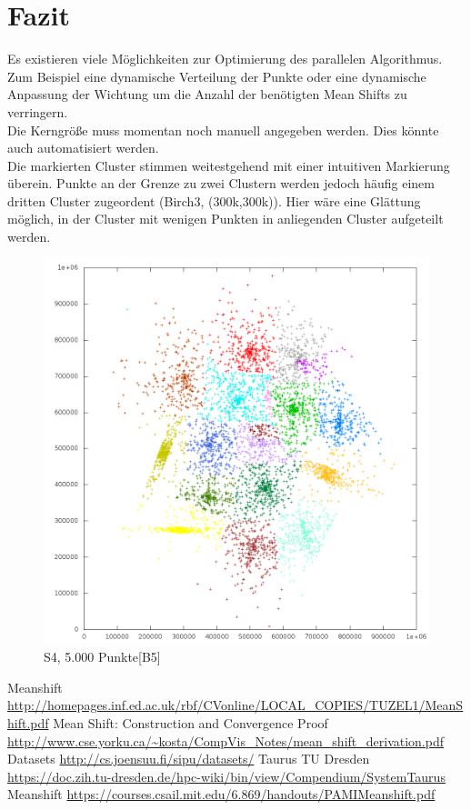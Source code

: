 \section{Fazit}
	Es existieren viele Möglichkeiten zur Optimierung des parallelen Algorithmus. Zum Beispiel eine dynamische Verteilung der Punkte oder eine dynamische Anpassung
	der Wichtung um die Anzahl der benötigten Mean Shifts zu verringern.\\
	Die Kerngröße muss momentan noch manuell angegeben werden. Dies könnte auch automatisiert werden.\\
	Die markierten Cluster stimmen weitestgehend mit einer intuitiven Markierung überein. Punkte an der Grenze zu zwei Clustern werden jedoch häufig einem 
	dritten Cluster zugeordent (Birch3, (300k,300k)). Hier wäre eine Glättung möglich, in der Cluster mit wenigen Punkten in anliegenden Cluster aufgeteilt werden.\\
	\begin{figure}[H]
		\centering
		\includegraphics[scale=0.6]{../meanshift/output/pics/s4_colored.png} 
		\caption{S4, 5.000 Punkte[B5]}
	\end{figure}
\begin{thebibliography}{999}
	\bibitem [0] {} Meanshift \url{http://homepages.inf.ed.ac.uk/rbf/CVonline/LOCAL_COPIES/TUZEL1/MeanShift.pdf}
	\bibitem [1] {} Mean Shift: Construction and Convergence Proof \url{http://www.cse.yorku.ca/~kosta/CompVis_Notes/mean_shift_derivation.pdf}
	\bibitem [2] {} Datasets \url{http://cs.joensuu.fi/sipu/datasets/}
	\bibitem [3] {} Taurus TU Dresden \url{https://doc.zih.tu-dresden.de/hpc-wiki/bin/view/Compendium/SystemTaurus}
	\bibitem [4] {} Meanshift \url{https://courses.csail.mit.edu/6.869/handouts/PAMIMeanshift.pdf}
	\newline
\end{thebibliography}
